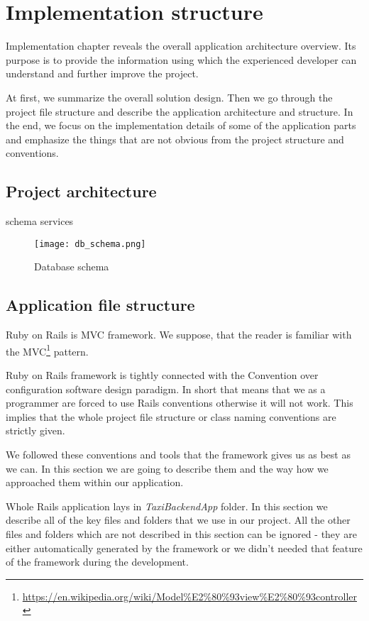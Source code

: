 \chapter{Implementation structure}
Implementation chapter reveals the overall application architecture overview. Its purpose is to provide the information using which the experienced developer can understand and further improve the project. 

At first, we summarize the overall solution design. Then we go through the project file structure and describe the application architecture and structure. In the end, we focus on the implementation details of some of the application parts and emphasize the things that are not obvious from the project structure and conventions.


\section{Project architecture}
schema services 

\begin{figure}[h]\centering
	\texttt{[image: db\_schema.png]}
	\caption{Database schema} 
	\label{database-schema}
\end{figure} 


\section {Application file structure}
	Ruby on Rails is MVC framework. We suppose, that the reader is familiar with the MVC\footnote{\url{https://en.wikipedia.org/wiki/Model\%E2\%80\%93view\%E2\%80\%93controller}} pattern.
	
	Ruby on Rails framework is tightly connected with the Convention over configuration software design paradigm. In short that means that we as a programmer are forced to use Rails conventions otherwise it will not work. This implies that the whole project file structure or class naming conventions are strictly given. 
	
	We followed these conventions and tools that the framework gives us as best as we can. In this section we are going to describe them and the way how we approached them within our application.
	
	Whole Rails application lays in \textit{TaxiBackendApp} folder. In this section we describe all of the key files and folders that we  use in our project. All the other files and folders which are not described in this section can be ignored - they are either automatically generated by the framework or we didn't needed that feature of the framework during the development.
	
